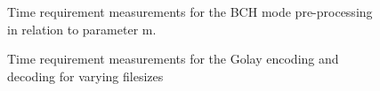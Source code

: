 \begin{figure}
\centering
\caption{Time requirement measurements for the BCH mode pre-processing in relation to parameter m.}
\label{img:bch_time}
\end{figure}


\begin{figure}
\centering
{}
\caption{Time requirement measurements for the Golay encoding and decoding for varying filesizes}
\label{img:golay_time}
\end{figure}
